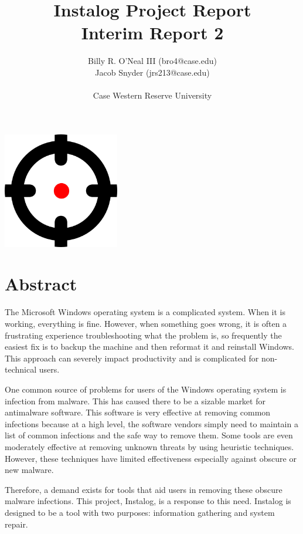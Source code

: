 \documentclass[letterpaper,12pt]{article}
\title{Instalog Project Report \\
Interim Report 2}
\author{
Billy R. O'Neal III (bro4@case.edu) \\
Jacob Snyder (jrs213@case.edu) \\ \\
Case Western Reserve University
}
\begin{document}
\maketitle
\vspace{1in}
\begin{center}
\includegraphics[width=2in, height=2in]{figures/InstalogLogo.png}
\end{center}
\newpage



\tableofcontents
\newpage



\section{Abstract} \label{abstract}
The Microsoft Windows operating system is a complicated system.  When it is
working, everything is fine.  However, when something goes wrong, it is often a
frustrating experience troubleshooting what the problem is, so frequently the
easiest fix is to backup the machine and then reformat it and reinstall Windows.
This approach can severely impact productivity and is complicated for
non-technical users.  

One common source of problems for users of the Windows operating system is
infection from malware.  This has caused there to be a sizable market for
antimalware software.  This software is very effective at removing common
infections because at a high level, the software vendors simply need to maintain
a list of common infections and the safe way to remove them.  Some tools are
even moderately effective at removing unknown threats by using heuristic
techniques.  However, these techniques have limited effectiveness especially
against obscure or new malware.  

Therefore, a demand exists for tools that aid users in removing these obscure
malware infections.  This project, Instalog, is a response to this need. 
Instalog is designed to be a tool with two purposes: information gathering and
system repair.
\end{document}
